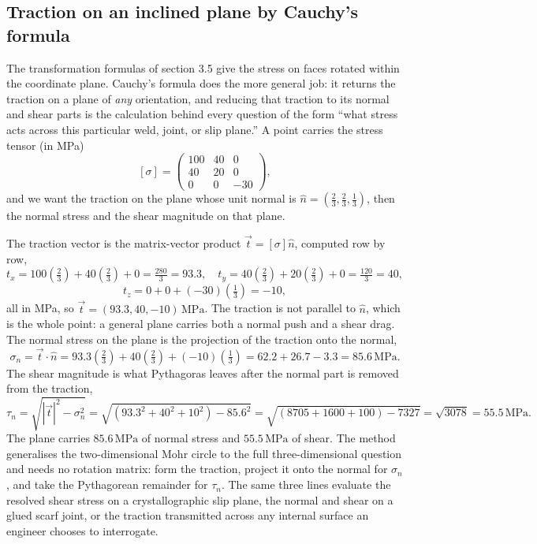 \subsection{Traction on an inclined plane by Cauchy's formula}

The transformation formulas of section 3.5 give the stress on faces
rotated within the coordinate plane. Cauchy's formula does the more
general job: it returns the traction on a plane of \emph{any}
orientation, and reducing that traction to its normal and shear parts is
the calculation behind every question of the form ``what stress acts
across this particular weld, joint, or slip plane.'' A point carries the
stress tensor (in MPa)
\[
[\sigma] = \begin{pmatrix} 100 & 40 & 0 \\ 40 & 20 & 0 \\ 0 & 0 & -30
\end{pmatrix},
\]
and we want the traction on the plane whose unit normal is $\hat{n} = (
\tfrac{2}{3}, \tfrac{2}{3}, \tfrac{1}{3})$, then the normal stress and
the shear magnitude on that plane.

The traction vector is the matrix-vector product $\vec{t} = [\sigma]
\hat{n}$, computed row by row,
\[
t_x = 100(\tfrac{2}{3}) + 40(\tfrac{2}{3}) + 0 = \tfrac{280}{3} = 93.3,
\quad t_y = 40(\tfrac{2}{3}) + 20(\tfrac{2}{3}) + 0 = \tfrac{120}{3} =
40,
\]
\[
t_z = 0 + 0 + (-30)(\tfrac{1}{3}) = -10,
\]
all in MPa, so $\vec{t} = (93.3, 40, -10)\,\text{MPa}$. The traction is
not parallel to $\hat{n}$, which is the whole point: a general plane
carries both a normal push and a shear drag. The normal stress on the
plane is the projection of the traction onto the normal,
\[
\sigma_n = \vec{t}\cdot\hat{n} = 93.3(\tfrac{2}{3}) + 40(\tfrac{2}{3}) +
(-10)(\tfrac{1}{3}) = 62.2 + 26.7 - 3.3 = 85.6\,\text{MPa}.
\]
The shear magnitude is what Pythagoras leaves after the normal part is
removed from the traction,
\[
\tau_n = \sqrt{|\vec{t}|^2 - \sigma_n^2} = \sqrt{(93.3^2 + 40^2 + 10^2) -
85.6^2} = \sqrt{(8705 + 1600 + 100) - 7327} = \sqrt{3078} = 55.5\,\text{
MPa}.
\]
The plane carries $85.6\,\text{MPa}$ of normal stress and $55.5\,\text{
MPa}$ of shear. The method generalises the two-dimensional Mohr circle
to the full three-dimensional question and needs no rotation matrix: form
the traction, project it onto the normal for $\sigma_n$, and take the
Pythagorean remainder for $\tau_n$. The same three lines evaluate the
resolved shear stress on a crystallographic slip plane, the normal and
shear on a glued scarf joint, or the traction transmitted across any
internal surface an engineer chooses to interrogate.


